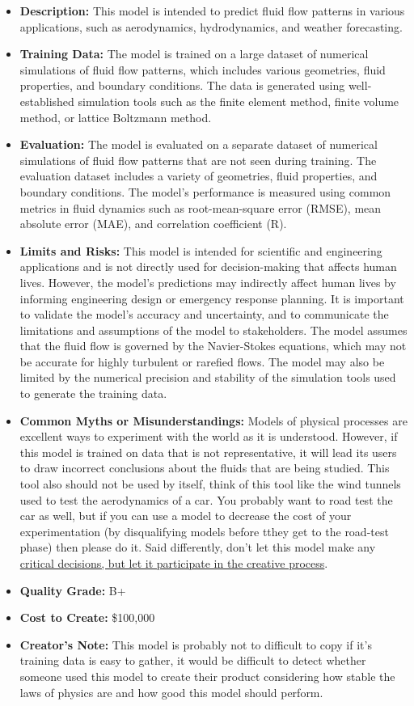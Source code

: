 \begin{itemize}
    \item \textbf{Description:} This model is intended to predict fluid flow patterns in various applications, such as aerodynamics, hydrodynamics, and weather forecasting.
    \item \textbf{Training Data:} The model is trained on a large dataset of numerical simulations of fluid flow patterns, which includes various geometries, fluid properties, and boundary conditions. The data is generated using well-established simulation tools such as the finite element method, finite volume method, or lattice Boltzmann method.
    \item \textbf{Evaluation:} The model is evaluated on a separate dataset of numerical simulations of fluid flow patterns that are not seen during training. The evaluation dataset includes a variety of geometries, fluid properties, and boundary conditions. The model's performance is measured using common metrics in fluid dynamics such as root-mean-square error (RMSE), mean absolute error (MAE), and correlation coefficient (R).
    \item \textbf{Limits and Risks:} This model is intended for scientific and engineering applications and is not directly used for decision-making that affects human lives. However, the model's predictions may indirectly affect human lives by informing engineering design or emergency response planning. It is important to validate the model's accuracy and uncertainty, and to communicate the limitations and assumptions of the model to stakeholders. The model assumes that the fluid flow is governed by the Navier-Stokes equations, which may not be accurate for highly turbulent or rarefied flows. The model may also be limited by the numerical precision and stability of the simulation tools used to generate the training data.
    \item \textbf{Common Myths or Misunderstandings:} Models of physical processes are excellent ways to experiment with the world as it is understood. However, if this model is trained on data that is not representative, it will lead its users to draw incorrect conclusions about the fluids that are being studied. This tool also should not be used by itself, think of this tool like the wind tunnels used to test the aerodynamics of a car. You probably want to road test the car as well, but if you can use a model to decrease the cost of your experimentation (by disqualifying models before tthey get to the road-test phase) then please do it. Said differently, don't let this model make any \hyperref[sec:creative]{critical decisions, but let it participate in the creative process}.
    \item \textbf{Quality Grade:} B+
    \item \textbf{Cost to Create:} \$100,000
    \item \textbf{Creator's Note:} This model is probably not to difficult to copy if it's training data is easy to gather, it would be difficult to detect whether someone used this model to create their product considering how stable the laws of physics are and how good this model should perform. 
\end{itemize}

